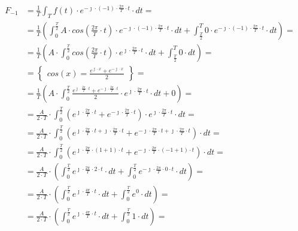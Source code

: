 \begin{task}
\begin{align*}
F_{-1}&=\frac{1}{T}\int_{T}f(t) \cdot e^{-\jmath \cdot (-1) \cdot \frac{2\pi}{T} \cdot t} \cdot dt=\\
&=\frac{1}{T}\left( \int_{0}^{\frac{T}{2}}A \cdot cos\left( \frac{2\pi}{T} \cdot t\right) \cdot e^{ - \jmath \cdot (-1) \cdot \frac{2\pi}{T} \cdot t} \cdot dt + \int_{\frac{T}{2}}^{T} 0 \cdot e^{ - \jmath \cdot (-1) \cdot \frac{2\pi}{T} \cdot t} \cdot dt\right)=\\
&=\frac{1}{T}\left( A \cdot  \int_{0}^{\frac{T}{2}}cos\left( \frac{2\pi}{T} \cdot t\right) \cdot e^{ \jmath \cdot \frac{2\pi}{T} \cdot t} \cdot dt + \int_{\frac{T}{2}}^{T} 0 \cdot dt\right)=\\
&=\begin{Bmatrix}
cos\left(x\right) = \frac{e^{\jmath \cdot x}+e^{-\jmath \cdot x}}{2}
\end{Bmatrix}=\\
&=\frac{1}{T}\left( A \cdot  \int_{0}^{\frac{T}{2}} \frac{e^{\jmath \cdot \frac{2\pi}{T} \cdot t}+e^{-\jmath \cdot \frac{2\pi}{T} \cdot t}}{2} \cdot e^{ \jmath \cdot \frac{2\pi}{T} \cdot t} \cdot dt + 0\right)=\\
&=\frac{A}{2\cdot T}\cdot  \int_{0}^{\frac{T}{2}} \left(e^{\jmath \cdot \frac{2\pi}{T} \cdot t}+e^{-\jmath \cdot \frac{2\pi}{T} \cdot t}\right) \cdot e^{ \jmath \cdot \frac{2\pi}{T} \cdot t} \cdot dt =\\
&=\frac{A}{2\cdot T}\cdot  \int_{0}^{\frac{T}{2}} \left(e^{\jmath \cdot \frac{2\pi}{T} \cdot t + \jmath \cdot \frac{2\pi}{T} \cdot t}+e^{-\jmath \cdot \frac{2\pi}{T} \cdot t + \jmath \cdot \frac{2\pi}{T} \cdot t}\right) \cdot dt =\\
&=\frac{A}{2\cdot T}\cdot  \int_{0}^{\frac{T}{2}} \left(e^{\jmath \cdot \frac{2\pi}{T} \cdot \left(1 + 1\right) \cdot t}+e^{-\jmath \cdot \frac{2\pi}{T} \cdot \left(-1+1\right)\cdot t }\right) \cdot dt =\\
&=\frac{A}{2\cdot T}\cdot \left( \int_{0}^{\frac{T}{2}} e^{\jmath \cdot \frac{2\pi}{T} \cdot 2 \cdot t} \cdot dt + \int_{0}^{\frac{T}{2}} e^{-\jmath \cdot \frac{2\pi}{T} \cdot 0 \cdot t } \cdot dt \right)=\\
&=\frac{A}{2\cdot T}\cdot \left( \int_{0}^{\frac{T}{2}} e^{\jmath \cdot \frac{4\pi}{T} \cdot t } \cdot dt +  \int_{0}^{\frac{T}{2}} e^{0} \cdot dt\right)=\\
&=\frac{A}{2\cdot T}\cdot \left( \int_{0}^{\frac{T}{2}} e^{\jmath \cdot \frac{4\pi}{T} \cdot t } \cdot dt + \int_{0}^{\frac{T}{2}} 1 \cdot dt\right)=\\

\end{align*}
\end{task}
